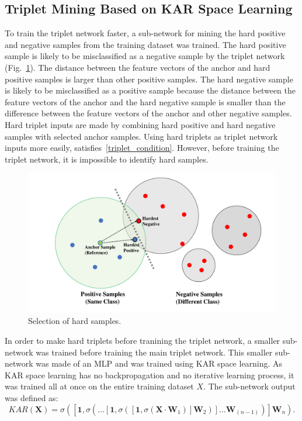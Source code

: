 \subsection{Triplet Mining Based on KAR Space Learning}
To train the triplet network faster, a sub-network for mining the hard positive and negative samples from the training dataset was trained.
The hard positive sample is likely to be misclassified as a negative sample by the triplet network (Fig.~\ref{fig2}).
The distance between the feature vectors of the anchor and hard positive samples is larger than other positive samples.
The hard negative sample is likely to be misclassified as a positive sample because the distance between the feature vectors of the anchor and the hard negative sample is smaller than the difference between the feature vectors of the anchor and other negative samples.
Hard triplet inputs are made by combining hard positive and hard negative samples with selected anchor samples. Using hard triplets as triplet network inputs more easily, satisfies~\ref{triplet_condition}. However, before training the triplet network, it is impossible to identify hard samples.
\begin{figure}[!ht]
    \includegraphics[width=\textwidth]
        {fig_hardsample_v2.pdf}
    \caption{Selection of hard samples.} \label{fig2}
\end{figure}
In order to make hard triplets before tranining the triplet network, a smaller sub-network was trained before training the main triplet network.
This smaller sub-network was made of an MLP and was trained using KAR space learning. As KAR space learning has no backpropagation and no iterative learning process, it was trained all at once on the entire training dataset $X$. 
The sub-network output was defined as: 
\begin{equation}
    KAR\left(\mathbf{X}\right)=\sigma\left(\left[\mathbf{1},\sigma\left(\dots\left[\mathbf{1},\sigma\left(\left[\mathbf{1},\sigma\left(\mathbf{X}\cdot\mathbf{W}_{1}\right)\right]\mathbf{W}_{2}\right)\right]\dots\mathbf{W}_{(n-1)}\right)\right]\mathbf{W}_{n}\right).
\end{equation}
